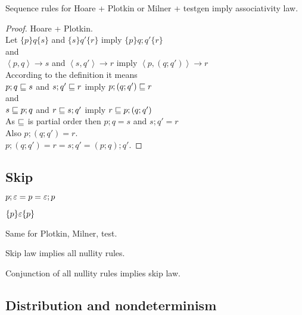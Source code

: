 \documentclass{article}
\begin{document}
\begin{theorem}
Sequence rules for Hoare + Plotkin or Milner + testgen imply associativity law.
\end{theorem}

\begin{proof}
Hoare + Plotkin.\\
Let $\{p\}q\{s\}$ and $\{s\}q'\{r\}$ imply $\{p\}q;q'\{r\}$\\
and\\
$\left\langle p, q \right\rangle \rightarrow s$ and $\left\langle s, q' \right\rangle \rightarrow r$ imply $\left\langle p, (q; q') \right\rangle \rightarrow r$\\
According to the definition it means\\
$p; q \sqsubseteq s$ and $s; q' \sqsubseteq r$ imply $p; (q; q') \sqsubseteq r$\\
and\\
$s \sqsubseteq p; q$ and $r \sqsubseteq s; q'$ imply $r \sqsubseteq p; (q; q')$\\
As $\sqsubseteq$ is partial order then $p; q = s$ and $s; q' = r$\\
Also $p; (q; q') = r$.\\
$p; (q; q') = r = s; q' = (p; q); q'$.
\end{proof}

\subsection*{Skip}

\begin{law}[Skip]
$p;\varepsilon = p = \varepsilon;p$
\end{law}

\begin{rul}
$\{p\}\varepsilon\{p\}$
\end{rul}

Same for Plotkin, Milner, test.

\begin{theorem}
Skip law implies all nullity rules.
\end{theorem}

\begin{theorem}
Conjunction of all nullity rules implies skip law.
\end{theorem}


\subsection*{Distribution and nondeterminism}
\end{document}
